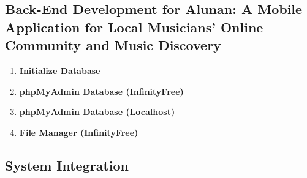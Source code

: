 \clearpage

\subsection{Back-End Development for Alunan: A Mobile Application for Local Musicians’ Online Community and Music Discovery}
\begin{enumerate}[1.]
    \item \textbf{Initialize Database}
    \item \textbf{phpMyAdmin Database (InfinityFree)}
    \item \textbf{phpMyAdmin Database (Localhost)}
    \item \textbf{File Manager (InfinityFree)}
\end{enumerate}

\clearpage

\subsection{System Integration}

\clearpage


